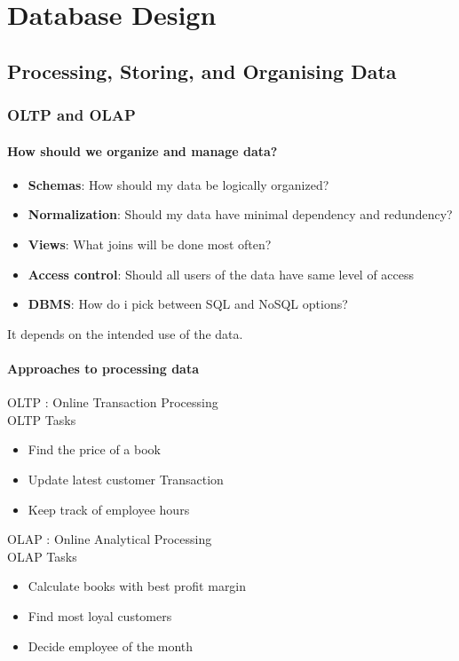 \chapter{Database Design}
\section{Processing, Storing, and Organising Data}
\subsection{OLTP and OLAP}
\subsubsection{How should we organize and manage data?}
\begin{itemize}
    \item \textbf{Schemas}: How should my data be logically organized?
    \item \textbf{Normalization}: Should my data have minimal dependency and redundency?
    \item \textbf{Views}: What joins will be done most often?
    \item \textbf{Access control}: Should all users of the data have same level of access
    \item \textbf{DBMS}: How do i pick between SQL and NoSQL options?
\end{itemize}
It depends on the intended use of the data.

\subsubsection{Approaches to processing data}
OLTP : Online Transaction Processing \\
OLTP Tasks
\begin{itemize}
    \item Find the price of a book
    \item Update latest customer Transaction
    \item Keep track of employee hours
\end{itemize}

OLAP : Online Analytical Processing \\
OLAP Tasks
\begin{itemize}
    \item Calculate books with best profit margin
    \item Find most loyal customers
    \item Decide employee of the month
\end{itemize}

